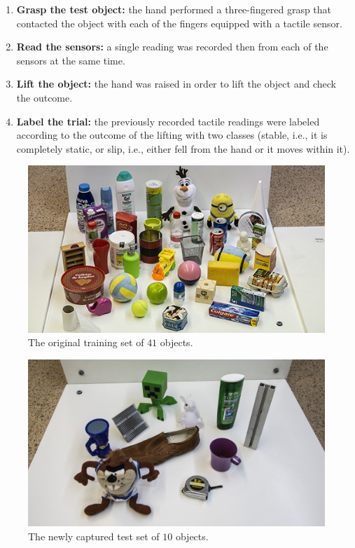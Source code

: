 \begin{enumerate}
	\item \textbf{Grasp the test object:} the hand performed a three-fingered grasp that contacted the object with each of the fingers equipped with a tactile sensor.	
	\item \textbf{Read the sensors:} a single reading was recorded then from each of the sensors at the same time.
	\item \textbf{Lift the object:} the hand was raised in order to lift the object and check the outcome.
	\item \textbf{Label the trial:} the previously recorded tactile readings were labeled according to the outcome of the lifting with two classes (stable, i.e., it is completely static, or slip, i.e., either fell from the hand or it moves within it).
\end{enumerate}

\begin{figure}[!htb]
	\centering
	\includegraphics[width=0.95\linewidth]{Figures/Tactile/dataset/trainobjects2-downsampled.jpg}
	\caption{The original training set of $41$ objects.}
	\label{fig:dataset_train}
\end{figure}

\begin{figure}[!htb]
	\centering
	\includegraphics[width=0.95\linewidth]{Figures/Tactile/dataset/testobjects.jpg}
	\caption{The newly captured test set of $10$ objects.}
	\label{fig:dataset_test}
\end{figure}

